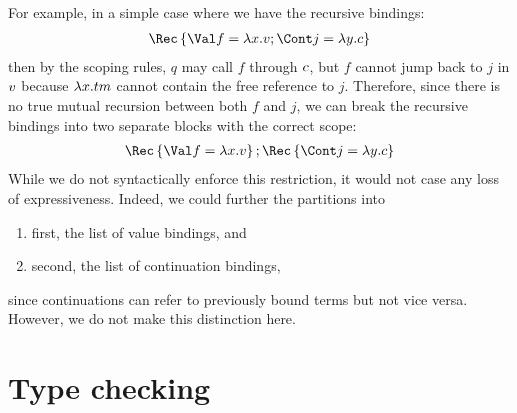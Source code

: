 \documentclass{article}
\begin{document}
For example, in a simple case where we have the recursive bindings:
\begin{gather*}
  \rec{\bindv{f}{\fn x \tm}; \bindk{j}{\fnk{y}\cmd}}
\end{gather*}
then by the scoping rules, $q$ may call $f$ through $c$, but $f$ cannot jump
back to $j$ in $v$ because $\lambda{x}. tm$ cannot contain the free reference to
$j$.  Therefore, since there is no true mutual recursion between both $f$ and
$j$, we can break the recursive bindings into two separate blocks with the
correct scope:
\begin{gather*}
  \rec{\bindv{f}{\fn x \tm}}; \rec{\bindk{j}{\fnk{y}\cmd}}
\end{gather*}
While we do not syntactically enforce this restriction, it would not case any
loss of expressiveness.  Indeed, we could further the partitions into
\begin{enumerate}
\item first, the list of value bindings, and
\item second, the list of continuation bindings,
\end{enumerate}
since continuations can refer to previously bound terms but not vice versa.
However, we do not make this distinction here.

\section{Type checking}
\label{sec:typing}
\end{document}
